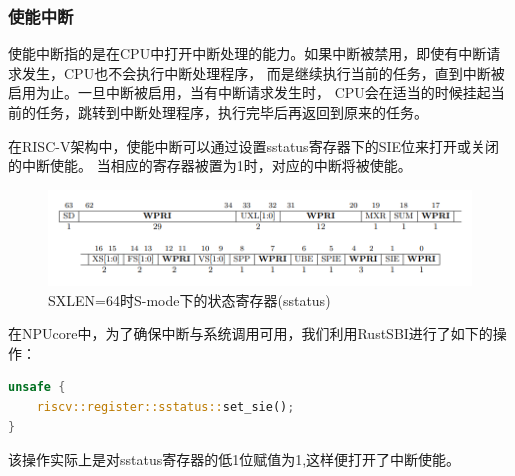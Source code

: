 \subsubsection{使能中断}

使能中断指的是在CPU中打开中断处理的能力。如果中断被禁用，即使有中断请求发生，CPU也不会执行中断处理程序，
而是继续执行当前的任务，直到中断被启用为止。一旦中断被启用，当有中断请求发生时，
CPU会在适当的时候挂起当前的任务，跳转到中断处理程序，执行完毕后再返回到原来的任务。

在RISC-V架构中，使能中断可以通过设置sstatus寄存器下的SIE位来打开或关闭的中断使能。
当相应的寄存器被置为1时，对应的中断将被使能。

\begin{figure}[htb]
    \centering
    \includegraphics[width=\textwidth]{figures/03-03-SXLEN=64时S-mode下的状态寄存器(sstatus).png}
    \caption{
        SXLEN=64时S-mode下的状态寄存器(sstatus)
    }
    \label{fig:SXLEN=64时S-mode下的状态寄存器(sstatus)}
\end{figure}

在NPUcore中，为了确保中断与系统调用可用，我们利用RustSBI进行了如下的操作：

\begin{lstlisting}[language={Rust}]
unsafe {
    riscv::register::sstatus::set_sie();
}
\end{lstlisting}

该操作实际上是对sstatus寄存器的低1位赋值为1,这样便打开了中断使能。

